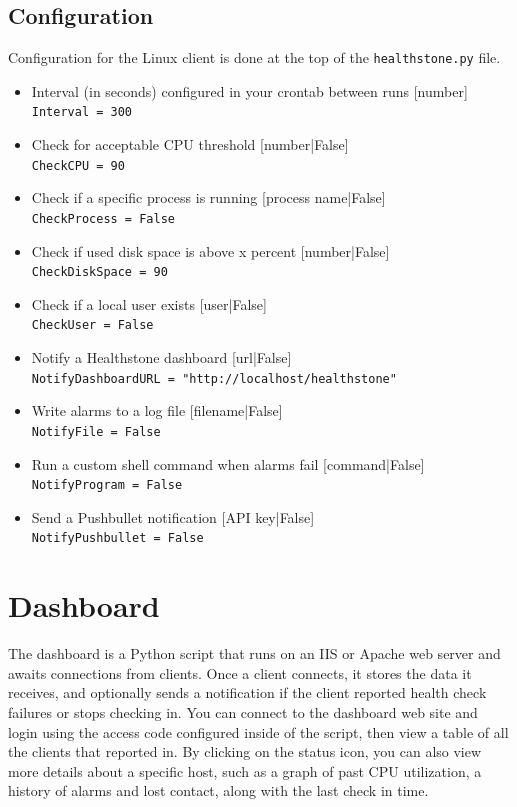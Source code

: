 \documentclass[11pt]{article}
\begin{document}
\subsection{Configuration}

Configuration for the Linux client is done at the top of the \texttt{healthstone.py} file.

\begin{itemize}
\item Interval (in seconds) configured in your crontab between runs [number]\\
\texttt{Interval = 300}
\item Check for acceptable CPU threshold [number|False]\\
\texttt{CheckCPU = 90}
\item Check if a specific process is running [process name|False]\\
\texttt{CheckProcess = False}
\item Check if used disk space is above x percent [number|False]\\
\texttt{CheckDiskSpace = 90}
\item Check if a local user exists [user|False]\\
\texttt{CheckUser = False}
\item Notify a Healthstone dashboard [url|False]\\
\texttt{NotifyDashboardURL = "http://localhost/healthstone"}
\item Write alarms to a log file [filename|False]\\
\texttt{NotifyFile = False}
\item Run a custom shell command when alarms fail [command|False]\\
\texttt{NotifyProgram = False}
\item Send a Pushbullet notification [API key|False]\\
\texttt{NotifyPushbullet = False}
\end{itemize}


\section{Dashboard}

The dashboard is a Python script that runs on an IIS or Apache web server and awaits connections from clients. Once a client connects, it stores the data it receives, and optionally sends a notification if the client reported health check failures or stops checking in. You can connect to the dashboard web site and login using the access code configured inside of the script, then view a table of all the clients that reported in. By clicking on the status icon, you can also view more details about a specific host, such as a graph of past CPU utilization, a history of alarms and lost contact, along with the last check in time.
\end{document}
